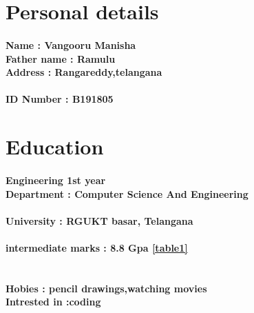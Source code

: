 \documentclass[12pt]{article}
\title{\LARGE\color{red}{RESUME}}
\author{V MANISHA}
\date{july 2022}
\begin{document}
\maketitle


\section*{\color{blue}Personal details}

\paragraph{Name : Vangooru Manisha\\Father name : Ramulu\\Address : Rangareddy,telangana}

\paragraph{ID Number : B191805}

\section*{\color{blue}Education} 

\paragraph{Engineering 1st year\\Department : Computer Science And Engineering }

\paragraph{University : RGUKT basar, Telangana}

\paragraph{intermediate marks : 8.8 Gpa \ref{table1}}

\section*{\small\color{purple}{other details:}}

\paragraph{Hobies : pencil drawings,watching movies\\Intrested in :coding\\}
\end{document}

